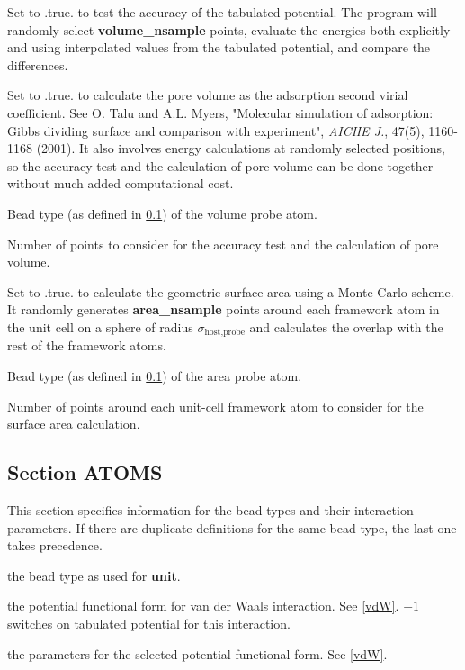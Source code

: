 \documentclass[12pt,letterpaper]{article}
\begin{document}
 Set to .true. to test the accuracy
of the tabulated potential. The program will randomly select
\textbf{volume\_nsample} points, evaluate the energies both
explicitly and using interpolated values from the tabulated
potential, and compare the differences.

 Set to .true. to calculate the
pore volume as the adsorption second virial coefficient. See
O. Talu and A.L. Myers, "Molecular simulation of adsorption:
Gibbs dividing surface and comparison with experiment",
\textit{AICHE J.}, 47(5), 1160-1168 (2001). It also involves
energy calculations at randomly selected positions, so the
accuracy test and the calculation of pore volume can be done
together without much added computational cost.

 Bead type (as defined in
\ref{atoms}) of the volume probe atom.

 Number of points to consider
for the accuracy test and the calculation of pore volume.

 Set to .true. to calculate
the geometric surface area using a Monte Carlo scheme. It
randomly generates \textbf{area\_nsample} points around each
framework atom in the unit cell on a sphere of radius
$\sigma_{\textrm{host,probe}}$ and calculates the overlap
with the rest of the framework atoms.

 Bead type (as defined in
\ref{atoms}) of the area probe atom.

 Number of points around each
unit-cell framework atom to consider for the surface area
calculation.

\subsection{Section \textbf{ATOMS}}
\label{atoms}
This section specifies information for the bead types and
their interaction parameters. If there are duplicate
definitions for the same bead type, the last one takes
precedence.

 the bead type as used for {\bf unit}.

 the potential functional form for van
der Waals interaction. See \ref{vdW}. $-1$ switches on
tabulated potential for this interaction.

 the parameters for the
selected potential functional form. See \ref{vdW}.
\end{document}
